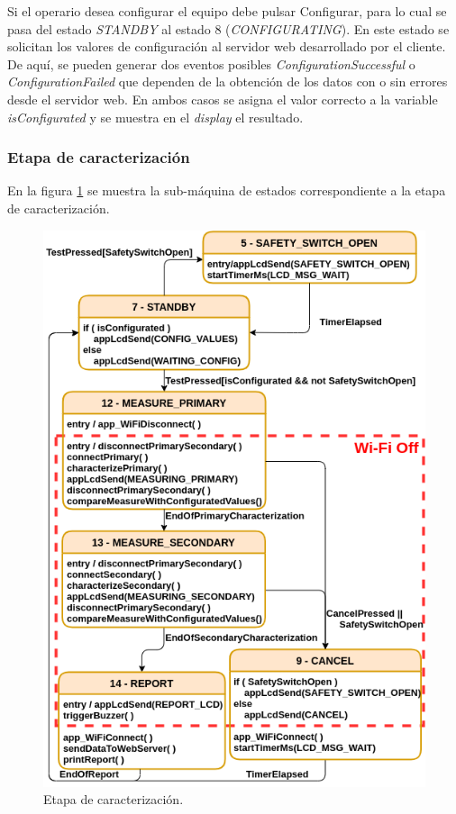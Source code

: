 Si el operario desea configurar el equipo debe pulsar Configurar, para lo cual se pasa del estado \textit{STANDBY} al estado 8 (\textit{CONFIGURATING}). En este estado se solicitan los valores de configuración al servidor web desarrollado por el cliente. De aquí, se pueden generar dos eventos posibles \textit{ConfigurationSuccessful} o \textit{ConfigurationFailed} que dependen de la obtención de los datos con o sin errores desde el servidor web. En ambos casos se asigna el valor correcto a la variable \textit{isConfigurated} y se muestra en el \textit{display} el resultado.

\subsubsection{Etapa de caracterización}
\label{subsubsec:EtTest}
En la figura \ref{fig:MainFSM_3} se muestra la sub-máquina de estados correspondiente a la etapa de caracterización. 

\begin{figure}[ht]
	\centering
	\includegraphics[scale=0.95]{./Figures/MainFSM_3.png}
	\caption{Etapa de caracterización.}
	\label{fig:MainFSM_3}
\end{figure}

